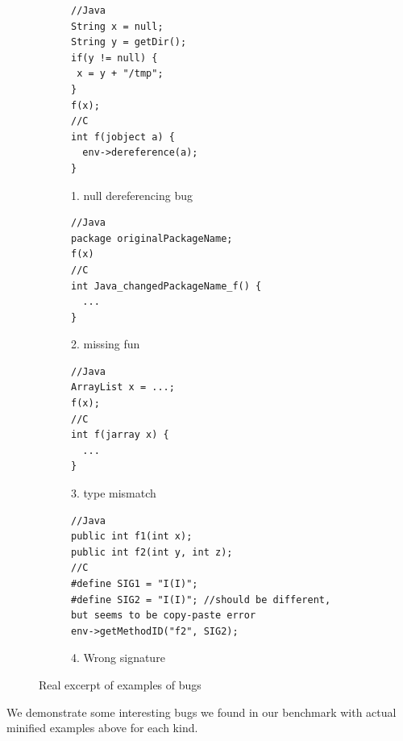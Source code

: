 
\begin{figure}[t]
  \centering
  \vspace{2mm}
  \begin{subfigure}[t]{0.5\textwidth}
    \begin{lstlisting}[style=cpp,xleftmargin=2.5em]
//Java
String x = null;
String y = getDir();
if(y != null) {
 x = y + "/tmp";
}
f(x);
//C
int f(jobject a) {
  env->dereference(a);
}
    \end{lstlisting}
    \vspace*{-.5em}
    \caption{1. null dereferencing bug}
    \label{fig:bug1}
  \end{subfigure}
  \begin{subfigure}[t]{0.5\textwidth}
    \begin{lstlisting}[style=cpp,xleftmargin=2.5em]
//Java
package originalPackageName;
f(x)
//C
int Java_changedPackageName_f() {
  ...
}
    \end{lstlisting}
    \vspace*{-.5em}
    \caption{2. missing fun}
    \label{fig:bug2}
  \end{subfigure}
  \begin{subfigure}[t]{0.5\textwidth}
    \begin{lstlisting}[style=cpp,xleftmargin=2.5em]
//Java
ArrayList x = ...;
f(x);
//C
int f(jarray x) {
  ...
}
    \end{lstlisting}
    \vspace*{-.5em}
    \caption{3. type mismatch}
    \label{fig:bug3}
  \end{subfigure}
  \begin{subfigure}[t]{0.5\textwidth}
    \begin{lstlisting}[style=cpp,xleftmargin=2.5em]
//Java
public int f1(int x);
public int f2(int y, int z);
//C
#define SIG1 = "I(I)";
#define SIG2 = "I(I)"; //should be different, but seems to be copy-paste error
env->getMethodID("f2", SIG2);
    \end{lstlisting}
    \vspace*{-.5em}
    \caption{4. Wrong signature}
    \label{fig:bug3}
  \end{subfigure}
  \vspace*{-.5em}
  \caption{Real excerpt of examples of bugs}
  \label{fig:bugs}
\end{figure}

We demonstrate some interesting bugs we found in our benchmark with actual minified examples above
for each kind.

